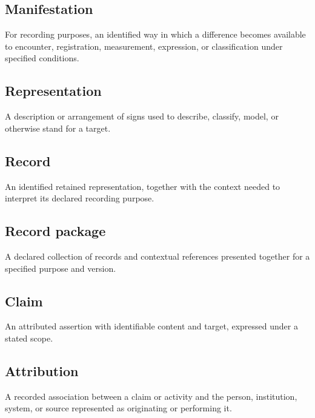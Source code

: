 \documentclass[11pt,a4paper]{article}
\begin{document}
\subsection{Manifestation}
For recording purposes, an identified way in which a difference becomes available to encounter, registration, measurement, expression, or classification under specified conditions.

\subsection{Representation}
A description or arrangement of signs used to describe, classify, model, or otherwise stand for a target.

\subsection{Record}
An identified retained representation, together with the context needed to interpret its declared recording purpose.

\subsection{Record package}
A declared collection of records and contextual references presented together for a specified purpose and version.

\subsection{Claim}
An attributed assertion with identifiable content and target, expressed under a stated scope.

\subsection{Attribution}
A recorded association between a claim or activity and the person, institution, system, or source represented as originating or performing it.
\end{document}
